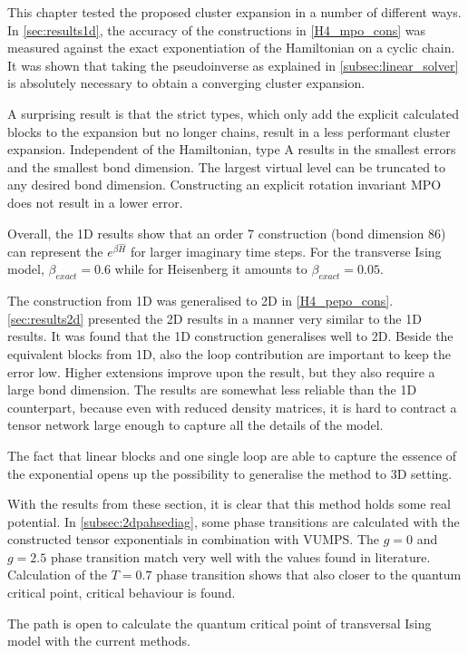 This chapter tested the proposed cluster expansion in a number of different ways. In \cref{sec:results1d}, the accuracy of the constructions in \cref{H4_mpo_cons} was measured against the exact exponentiation of the Hamiltonian on a cyclic chain. It was shown that taking the pseudoinverse as explained in \cref{subsec:linear_solver} is absolutely necessary to obtain a converging cluster expansion.

A surprising result is that the strict types, which only add the explicit calculated blocks to the expansion but no longer chains, result in a less performant cluster expansion. Independent of the Hamiltonian, type A results in the smallest errors and the smallest bond dimension. The largest virtual level can be truncated to any desired bond dimension. Constructing an explicit rotation invariant MPO does not result in a lower error.

Overall, the 1D results show that an order 7 construction (bond dimension 86) can represent the $e^{\beta \hat{H}}$ for larger imaginary time steps. For the transverse Ising model, $\beta_{exact} = 0.6$ while for Heisenberg it amounts to $\beta_{exact} = 0.05$.

The construction from 1D was generalised to 2D in \cref{H4_pepo_cons}. \cref{sec:results2d} presented the 2D results in a manner very similar to the 1D results. It was found that the 1D construction generalises well to 2D. Beside the equivalent blocks from 1D, also the loop contribution are important to keep the error low. Higher extensions improve upon the result, but they also require a large bond dimension. The results are somewhat less reliable than the 1D counterpart, because even with reduced density matrices, it is hard to contract a tensor network large enough to capture all the details of the model.

The fact that linear blocks and one single loop are able to capture the essence of the exponential opens up the possibility to generalise the method to 3D setting.

With the results from these section, it is clear that this method holds some real potential. In \cref{subsec:2dpahsediag}, some phase transitions are calculated with the constructed tensor exponentials in combination with VUMPS. The $g=0$ and $g=2.5$ phase transition match very well with the values found in literature. Calculation of the $T=0.7$ phase transition shows that also closer to the quantum critical point, critical behaviour is found.

The path is open to calculate the quantum critical point of transversal Ising model with the current methods.